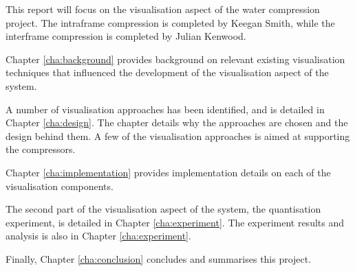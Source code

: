 This report will focus on the visualisation aspect of the water compression
project. The intraframe compression is completed by Keegan Smith, while the
interframe compression is completed by Julian Kenwood.

Chapter \ref{cha:background} provides background on relevant existing
visualisation techniques that influenced the development of the visualisation
aspect of the system.

A number of visualisation approaches has been identified, and is detailed in
Chapter \ref{cha:design}. The chapter details why the approaches are chosen and
the design behind them. A few of the visualisation approaches is aimed at
supporting the compressors.

Chapter \ref{cha:implementation} provides implementation details on each of the
visualisation components.

The second part of the visualisation aspect of the system, the quantisation
experiment, is detailed in Chapter \ref{cha:experiment}. The experiment results
and analysis is also in Chapter \ref{cha:experiment}.

Finally, Chapter \ref{cha:conclusion} concludes and summarises this project.



